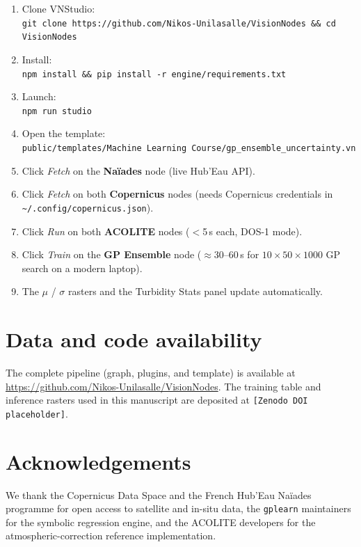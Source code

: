 \documentclass[11pt,a4paper]{article}
\begin{document}
\begin{enumerate}
    \item Clone VNStudio:\\
        \texttt{git clone https://github.com/Nikos-Unilasalle/VisionNodes \&\& cd VisionNodes}
    \item Install:\\
        \texttt{npm install \&\& pip install -r engine/requirements.txt}
    \item Launch:\\
        \texttt{npm run studio}
    \item Open the template:\\
        \texttt{public/templates/Machine Learning Course/gp\_ensemble\_uncertainty.vn}
    \item Click \emph{Fetch} on the \textbf{Naïades} node (live Hub'Eau API).
    \item Click \emph{Fetch} on both \textbf{Copernicus} nodes (needs Copernicus credentials in \texttt{\textasciitilde/.config/copernicus.json}).
    \item Click \emph{Run} on both \textbf{ACOLITE} nodes ($<$5\,s each, DOS-1 mode).
    \item Click \emph{Train} on the \textbf{GP Ensemble} node ($\approx$30--60\,s for $10\times50\times1000$ GP search on a modern laptop).
    \item The $\mu$ / $\sigma$ rasters and the Turbidity Stats panel update automatically.
\end{enumerate}

\section*{Data and code availability}
The complete pipeline (graph, plugins, and template) is available at \url{https://github.com/Nikos-Unilasalle/VisionNodes}. The training table and inference rasters used in this manuscript are deposited at \texttt{[Zenodo DOI placeholder]}.

\section*{Acknowledgements}
We thank the Copernicus Data Space and the French Hub'Eau Naïades programme for open access to satellite and in-situ data, the \texttt{gplearn} maintainers for the symbolic regression engine, and the ACOLITE developers for the atmospheric-correction reference implementation.



\end{document}
